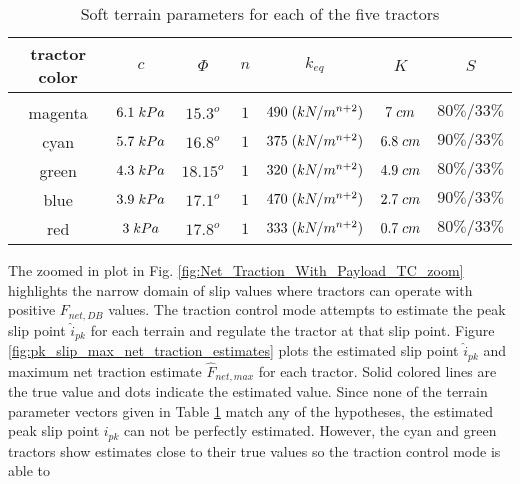 \begin{table}[tp]
\caption{Soft terrain parameters for each of the five tractors}
\label{table:soft_terrain_5tractors_TC}
\begin{center}
\vspace{-5mm}
\begin{tabular}{ |c|c|c|c|c|c|c| } 
 \hline
 tractor color & $c$ & $\Phi$ & $n$ & $k_{eq}$ & $K$ & $S$ \\ 
 \hline
  \vspace{-0.6mm} & \vspace{-0.6mm} & \vspace{-0.6mm} & \vspace{-0.6mm} & \vspace{-0.6mm} & \vspace{-0.6mm} & \vspace{-0.6mm}  \\
 \hline
 magenta & $6.1\hspace{1mm}kPa$ & $15.3^o$ & $1$ & $490\hspace{1mm}(kN/m^{n+2})$ & $7\hspace{1mm}cm$ & $80\%/33\%$\\ 
 \hline
 cyan & $5.7\hspace{1mm}kPa$ & $16.8^o$ & $1$ & $375\hspace{1mm}(kN/m^{n+2})$ & $6.8\hspace{1mm}cm$ & $ 90\%/33\%$ \\ 
 \hline
 green & $4.3\hspace{1mm}kPa$ & $18.15^o$ & $1$ & $320\hspace{1mm}(kN/m^{n+2})$ & $4.9\hspace{1mm}cm$ & $80\%/33\%$ \\ 
 \hline
 blue & $3.9\hspace{1mm}kPa$ & $17.1^o$ & $1$ & $470\hspace{1mm}(kN/m^{n+2})$ & $2.7\hspace{1mm}cm$ & $90\%/33\%$ \\ 
 \hline
 red & $3\hspace{1mm}kPa$ & $17.8^o$ & $1$ & $333\hspace{1mm}(kN/m^{n+2})$ & $0.7\hspace{1mm}cm$ & $80\%/33\%$ \\ 
 \hline
\end{tabular}
\end{center}
\end{table}
The zoomed in plot in Fig. \ref{fig:Net_Traction_With_Payload_TC_zoom} highlights the narrow domain of slip values where tractors can operate with positive $F_{net,DB}$ values. The traction control mode attempts to estimate the peak slip point $\hat{i}_{pk}$ for each terrain and regulate the tractor at that slip point. Figure \ref{fig:pk_slip_max_net_traction_estimates} plots the estimated slip point $\hat{i}_{pk}$ and maximum net traction estimate $\hat{F}_{net,max}$ for each tractor. Solid colored lines are the true value and dots indicate the estimated value. Since none of the terrain parameter vectors given in Table \ref{table:soft_terrain_5tractors_TC} match any of the hypotheses, the estimated peak slip point $i_{pk}$ can not be perfectly estimated. However, the cyan and green tractors show estimates close to their true values so the traction control mode is able to
